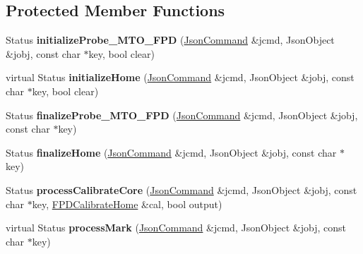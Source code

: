 \subsection*{Protected Member Functions}
\begin{DoxyCompactItemize}
\item 
\hypertarget{classfirestep_1_1_f_p_d_controller_a1b0c93f2e1444bf994b84744450ea5ed}{Status {\bfseries initialize\+Probe\+\_\+\+M\+T\+O\+\_\+\+F\+P\+D} (\hyperlink{classfirestep_1_1_json_command}{Json\+Command} \&jcmd, Json\+Object \&jobj, const char $\ast$key, bool clear)}\label{classfirestep_1_1_f_p_d_controller_a1b0c93f2e1444bf994b84744450ea5ed}

\item 
\hypertarget{classfirestep_1_1_f_p_d_controller_a183bdf8187896f0f348951172b3d6a00}{virtual Status {\bfseries initialize\+Home} (\hyperlink{classfirestep_1_1_json_command}{Json\+Command} \&jcmd, Json\+Object \&jobj, const char $\ast$key, bool clear)}\label{classfirestep_1_1_f_p_d_controller_a183bdf8187896f0f348951172b3d6a00}

\item 
\hypertarget{classfirestep_1_1_f_p_d_controller_aea1fe915de671d24c63457175cbc8b4b}{Status {\bfseries finalize\+Probe\+\_\+\+M\+T\+O\+\_\+\+F\+P\+D} (\hyperlink{classfirestep_1_1_json_command}{Json\+Command} \&jcmd, Json\+Object \&jobj, const char $\ast$key)}\label{classfirestep_1_1_f_p_d_controller_aea1fe915de671d24c63457175cbc8b4b}

\item 
\hypertarget{classfirestep_1_1_f_p_d_controller_a3ec03c9dda441548c65ed322181ea6c8}{Status {\bfseries finalize\+Home} (\hyperlink{classfirestep_1_1_json_command}{Json\+Command} \&jcmd, Json\+Object \&jobj, const char $\ast$key)}\label{classfirestep_1_1_f_p_d_controller_a3ec03c9dda441548c65ed322181ea6c8}

\item 
\hypertarget{classfirestep_1_1_f_p_d_controller_ac63ea83d6a9f94cbb783d55fa6325404}{Status {\bfseries process\+Calibrate\+Core} (\hyperlink{classfirestep_1_1_json_command}{Json\+Command} \&jcmd, Json\+Object \&jobj, const char $\ast$key, \hyperlink{classfirestep_1_1_f_p_d_calibrate_home}{F\+P\+D\+Calibrate\+Home} \&cal, bool output)}\label{classfirestep_1_1_f_p_d_controller_ac63ea83d6a9f94cbb783d55fa6325404}

\item 
\hypertarget{classfirestep_1_1_f_p_d_controller_af320324c335545085a7e4c34128070d9}{virtual Status {\bfseries process\+Mark} (\hyperlink{classfirestep_1_1_json_command}{Json\+Command} \&jcmd, Json\+Object \&jobj, const char $\ast$key)}\label{classfirestep_1_1_f_p_d_controller_af320324c335545085a7e4c34128070d9}


\end{DoxyCompactItemize}
